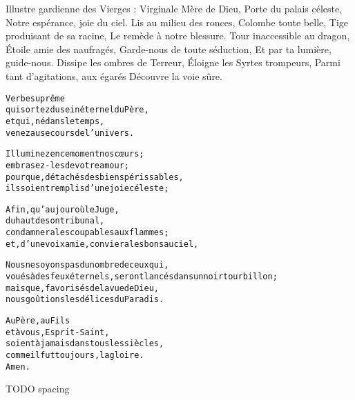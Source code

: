 \documentclass[psautier_nocturne_fr.tex]{subfiles}
\begin{document}
Illustre gardienne des Vierges :
        Virginale Mère de Dieu,
        Porte du palais céleste,
        Notre espérance, joie du ciel.
        Lis au milieu des ronces,
        Colombe toute belle,
        Tige produisant de sa racine,
        Le remède à notre blessure.    Tour inaccessible au dragon,
    Étoile amie des naufragés,
    Garde-nous de toute séduction,
    Et par ta lumière, guide-nous.
    Dissipe les ombres de Terreur,
    Éloigne les Syrtes trompeurs,
    Parmi tant d’agitations, aux égarés
    Découvre la voie sûre.


\begin{paracol}{2}
\begin{alltt}\normalfont        Verbe suprême
        qui sortez du sein éternel du Père,
        et qui, né dans le temps,
        venez au secours de l’univers.

        Illuminez en ce moment nos cœurs ;
        embrasez-les de votre amour ;
        pour que, détachés des biens périssables,
        ils soient remplis d’une joie céleste ;\end{alltt}
\switchcolumn
\begin{alltt}\normalfont        Afin, qu’au jour où le Juge,
        du haut de son tribunal,
        condamnera les coupables aux flammes ;
        et, d’une voix amie, conviera les bons au ciel,

        Nous ne soyons pas du nombre de ceux qui,
        voués à des feux éternels, seront lancés dans un noir tourbillon ;
        mais que, favorisés de la vue de Dieu,
        nous goûtions les délices du Paradis.\end{alltt}
\end{paracol}
\begin{alltt}\normalfont        Au Père, au Fils
        et à vous, Esprit-Saint,
        soient à jamais dans tous les siècles,
        comme il fut toujours, la gloire.
        Amen.\end{alltt} TODO spacing


\end{document}
